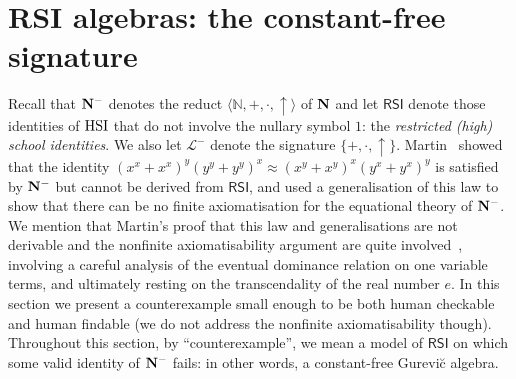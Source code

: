\documentclass[eqnor,reqno]{amsart}
\theoremstyle{plain}
\theoremstyle{definition}
\newcommand{\mon}{\dotdiv}
\newcommand{\RSI}{\textsf{RSI}}
\begin{document}



\section{RSI algebras: the constant-free signature}\label{sec:Martin}

Recall that ${\bf N}^{-}$ denotes the reduct $\langle
\mathbb{N},+,\cdot,\uparrow\rangle$ of ${\bf N}$ and let $\RSI$
denote those identities of ${\rm HSI}$ that do not involve the nullary
symbol $1$: the \emph{restricted (high) school identities}.  
We also let $\mathscr{L}^-$ denote the signature $\{+,\cdot,\uparrow\}$.
Martin~\cite{mar} showed that the identity
$(x^x+x^x)^y(y^y+y^y)^x\approx (x^y+x^y)^x(y^x+y^x)^y$ 
is satisfied by ${\bf N}^{-}$ but cannot be derived from $\RSI$, and used a generalisation of this law to show that there can be no finite axiomatisation for the equational theory of ${\bf N}^-$. 
We mention that Martin's proof that this law and generalisations are not derivable and the nonfinite axiomatisability argument are quite involved~\cite[pp.~99--118]{mar}, involving a careful analysis of the eventual dominance relation on one variable terms, and ultimately resting on the transcendality of the real number $e$.
In this section we present a counterexample small enough to be both human checkable and human findable (we do not address the nonfinite axiomatisability though).
Throughout this section, by
``counterexample'', we mean a model of $\RSI$ on which some valid
identity of ${\bf N}^{-}$ fails: in other words, a constant-free Gurevi\u{c} algebra.
\end{document}

